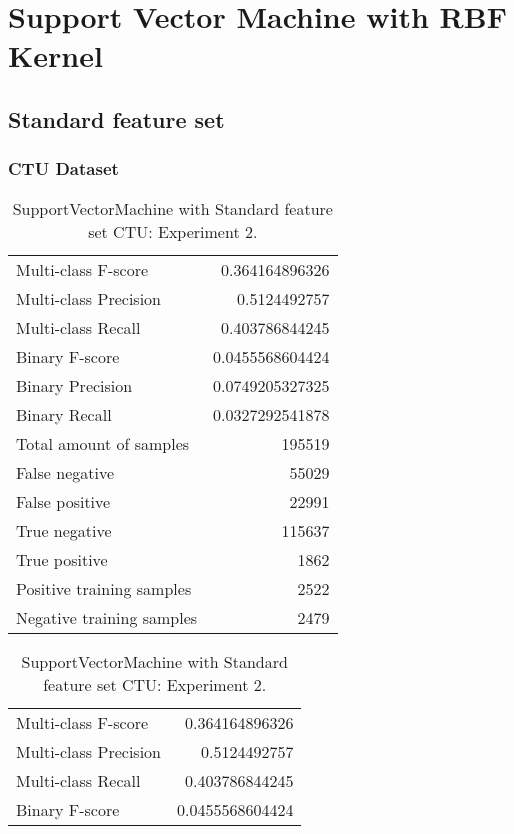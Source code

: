 
\chapter{Support Vector Machine with RBF Kernel} %

\section{Standard feature set}
\subsection{CTU Dataset}

\begin{table}[H]
\begin{minipage}{0.5\textwidth}
\caption{SupportVectorMachine with Standard feature set CTU: Experiment 1.}
\centering
\begin{tabular}{l r}
\toprule
Multi-class F-score & 0.364164896326 \\
Multi-class Precision & 0.5124492757 \\
Multi-class Recall & 0.403786844245 \\
\midrule
Binary F-score & 0.0455568604424 \\
Binary Precision & 0.0749205327325 \\
Binary Recall & 0.0327292541878 \\
\midrule
Total amount of samples & 195519 \\
False negative & 55029 \\
False positive & 22991 \\
True negative & 115637 \\
True positive & 1862 \\
\midrule
Positive training samples & 2522 \\
Negative training samples & 2479 \\
\bottomrule
\end{tabular}
\end{minipage}
\hfillx
\begin{minipage}{0.5\textwidth}
\caption{SupportVectorMachine with Standard feature set CTU: Experiment 2.}
\centering
\begin{tabular}{l r}
\toprule
Multi-class F-score & 0.364164896326 \\
Multi-class Precision & 0.5124492757 \\
Multi-class Recall & 0.403786844245 \\
\midrule
Binary F-score & 0.0455568604424 \\

\end{tabular}
\end{minipage}
\end{table}
